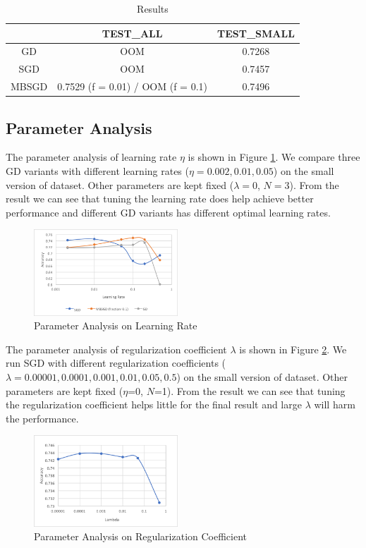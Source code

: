 \documentclass[sigconf]{acmart}
\begin{document}
\begin{table}[t]
\centering
\caption{Results}
\label{res}
\begin{tabular}{c|c|c}
         &\bf TEST\_ALL &\bf TEST\_SMALL \\ \hline \hline
GD & OOM &  0.7268\\
SGD & OOM & 0.7457 \\
MBSGD & 0.7529 (f = 0.01) / OOM (f = 0.1)  &  0.7496\\
\end{tabular}
\end{table}


\subsection{Parameter Analysis}
\label{subsection:ParameterAnalysis}
The parameter analysis of learning rate $\eta$ is shown in Figure \ref{lr}. We compare three GD variants with different learning rates ($\eta = 0.002, 0.01, 0.05$) on the small version of dataset. Other parameters are kept fixed ($\lambda = 0$, $N = 3$). From the result we can see that tuning the learning rate does help achieve better performance and different GD variants has different optimal learning rates.

\begin{figure}[t]
\centering
\includegraphics[width=0.48\textwidth]{lr.png}
\caption{Parameter Analysis on Learning Rate}
\label{lr}
\end{figure}

The parameter analysis of regularization coefficient $\lambda$ is shown in Figure \ref{reg}. We run SGD with different regularization coefficients ($\lambda = 0.00001, 0.0001, 0.001, 0.01, 0.05, 0.5$) on the small version of dataset. Other parameters are kept fixed ($\eta$=0, $N$=1). From the result we can see that tuning the regularization coefficient helps little for the final result and large $\lambda$ will harm the performance.

\begin{figure}[t]
\centering
\includegraphics[width=0.48\textwidth]{reg.png}
\caption{Parameter Analysis on Regularization Coefficient}
\label{reg}
\end{figure}
\end{document}
